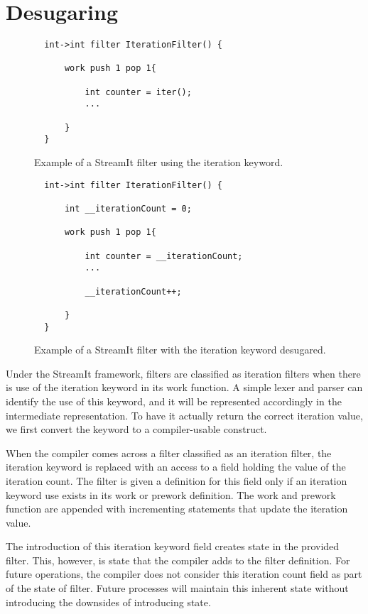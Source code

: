 \section{Desugaring}

\begin{figure}[t]
{\eightpoint
\begin{verbatim}
  int->int filter IterationFilter() {

      work push 1 pop 1{

          int counter = iter();
          ...

      }
  }
\end{verbatim}
\caption{Example of a StreamIt filter using the iteration keyword.\protect\label{fig:iter-filter-example}}}
\end{figure}


\begin{figure}[t]
{\eightpoint
\begin{verbatim}
  int->int filter IterationFilter() {

      int __iterationCount = 0;      

      work push 1 pop 1{

          int counter = __iterationCount;
          ...

          __iterationCount++;

      }
  }
\end{verbatim}
\caption{Example of a StreamIt filter with the iteration keyword desugared.\protect\label{fig:desugar-filter-example}}}
\end{figure}


Under the StreamIt framework, filters are classified as iteration filters when there is use of the iteration keyword in its work function.  A simple lexer and parser can identify the use of this keyword, and it will be represented accordingly in the intermediate representation.  To have it actually return the correct iteration value, we first convert the keyword to a compiler-usable construct.

When the compiler comes across a filter classified as an iteration filter, the iteration keyword is replaced with an access to a field holding the value of the iteration count.  The filter is given a definition for this field only if an iteration keyword use exists in its work or prework definition.  The work and prework function are appended with incrementing statements that update the iteration value.

The introduction of this iteration keyword field creates state in the provided filter.  This, however, is state that the compiler adds to the filter definition.  For future operations, the compiler does not consider this iteration count field as part of the state of filter.  Future processes will maintain this inherent state without introducing the downsides of introducing state.

